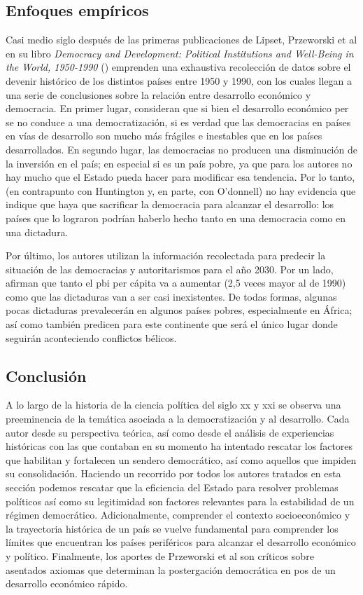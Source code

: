 \documentclass{article}
\begin{document}
\subsection{Enfoques empíricos}

Casi medio siglo después de las primeras publicaciones de Lipset, Przeworski et al
en su libro \textit{Democracy and Development: Political Institutions and Well-Being in 
the World, 1950-1990} (\citeyear{przeworski2000democracy}) emprenden una exhaustiva 
recolección de datos sobre el devenir histórico de los distintos países entre 1950 y 
1990, con los cuales llegan a una serie de conclusiones sobre la relación entre 
desarrollo económico y democracia. En 
primer lugar, consideran que si bien el desarrollo económico per se no conduce a una 
democratización, si es verdad que las democracias en países en vías de desarrollo son 
mucho más frágiles e inestables que en los países desarrollados. En segundo lugar,
las democracias no producen una disminución de la inversión en el país; en especial si es
un país pobre, ya que para los autores no hay mucho que el Estado pueda hacer para modificar
esa tendencia. Por lo tanto, (en contrapunto con Huntington y, en parte, con O'donnell) no hay 
evidencia que indique que haya que sacrificar la 
democracia para alcanzar el desarrollo: los países que lo lograron podrían
haberlo hecho tanto en una democracia como en una dictadura.

Por último, los autores utilizan la información recolectada para predecir la situación
de las democracias y autoritarismos para el año 2030. Por un lado, afirman que tanto
el pbi per cápita va a aumentar (2,5 veces mayor al de 1990) 
como que las dictaduras van a ser casi inexistentes. De todas formas, algunas pocas 
dictaduras prevalecerán en algunos países pobres, especialmente en África; así como
también predicen para este continente que será el único lugar donde seguirán aconteciendo
conflictos bélicos.

\subsection{Conclusión}
A lo largo de la historia de la ciencia política del siglo xx y xxi se observa una
preeminencia de la temática asociada a la democratización y al desarrollo. Cada autor
desde su perspectiva teórica, así como desde el análisis de experiencias históricas con las 
que contaban en su momento ha intentado
rescatar los factores que habilitan y fortalecen un sendero democrático, así como aquellos
que impiden su consolidación. Haciendo un recorrido por todos los autores tratados en esta
sección podemos rescatar que la eficiencia del Estado para resolver problemas políticos así
como su legitimidad son factores relevantes para la estabilidad de un régimen democrático.
Adicionalmente, comprender el contexto socioeconómico y la trayectoria histórica de un país
se vuelve fundamental para comprender los límites que encuentran los países periféricos para
alcanzar el desarrollo económico y político. Finalmente, los aportes de Przeworski et al
son críticos sobre asentados axiomas que determinan la postergación democrática en pos de un 
desarrollo económico rápido.
\end{document}
